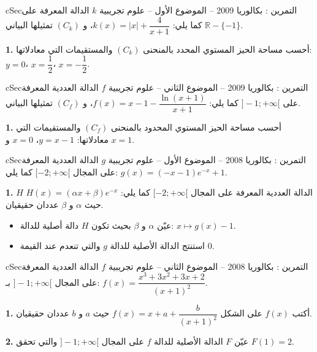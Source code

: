 \documentclass[12pt,a4paper]{article}
\newenvironment{BOX}[2]{\begin{otherlanguage}{english}\begin{arbox}{#1}{#2}}{\end{arbox}\end{otherlanguage}}
\newcounter{exo}
\newenvironment{tamrin}[1]{\stepcounter{exo}\begin{BOX}{cSec}{التمرين \theexo: #1}}{\end{BOX}}
\newcommand{\R}{\mathbb{R}}
\newenvironment{sq}{\begin{itemize}[leftmargin=2.4em,itemsep=3pt]}{\end{itemize}}
\newcommand{\qa}{\item[(أ)]}\newcommand{\qb}{\item[(ب)]}\newcommand{\qc}{\item[(جـ)]}\newcommand{\qd}{\item[(د)]}\newcommand{\qe}{\item[(هـ)]}
\newcommand{\QQ}[1]{\par\smallskip\textbf{#1.} }
\begin{document}
\begin{tamrin}{بكالوريا 2009 -- الموضوع الأول -- علوم تجريبية}
$k$ الدالة المعرفة على $\R-\{-1\}$ كما يلي: $k(x)=|x|+\dfrac4{x+1}$، و $(C_k)$ تمثيلها البياني.
\QQ{1} أحسب مساحة الحيز المستوي المحدد بالمنحنى $(C_k)$ والمستقيمات التي معادلاتها: $y=0$، $x=\dfrac12$، $x=-\dfrac12$.
\end{tamrin}

\begin{tamrin}{بكالوريا 2009 -- الموضوع الثاني -- علوم تجريبية}
$f$ الدالة العددية المعرفة على $]-1;+\infty[$ كما يلي: $f(x)=x-1-\dfrac{\ln(x+1)}{x+1}$، و $(C_f)$ تمثيلها البياني.
\QQ{1} أحسب مساحة الحيز المستوي المحدود بالمنحنى $(C_f)$ والمستقيمات التي معادلاتها: $y=x-1$، $x=0$ و $x=1$.
\end{tamrin}

\begin{tamrin}{بكالوريا 2008 -- الموضوع الأول -- علوم تجريبية}
$g$ الدالة العددية المعرفة على المجال $[-2;+\infty[$ كما يلي: $g(x)=(-x-1)e^{-x}+1$.
\QQ{1} $H$ الدالة العددية المعرفة على المجال $[-2;+\infty[$ كما يلي: $H(x)=(\alpha x+\beta)e^{-x}$ حيث $\alpha$ و $\beta$ عددان حقيقيان.
\begin{sq}
\qa عيّن $\alpha$ و $\beta$ بحيث تكون $H$ دالة أصلية للدالة: $x\mapsto g(x)-1$.
\qb استنتج الدالة الأصلية للدالة $g$ والتي تنعدم عند القيمة $0$.
\end{sq}
\end{tamrin}

\begin{tamrin}{بكالوريا 2008 -- الموضوع الثاني -- علوم تجريبية}
$f$ الدالة العددية المعرفة على المجال $]-1;+\infty[$ بـ: $f(x)=\dfrac{x^3+3x^2+3x+2}{(x+1)^2}$.
\QQ{1} أكتب $f(x)$ على الشكل $f(x)=x+a+\dfrac{b}{(x+1)^2}$ حيث $a$ و $b$ عددان حقيقيان.
\QQ{2} عيّن $F$ الدالة الأصلية للدالة $f$ على المجال $]-1;+\infty[$ والتي تحقق $F(1)=2$.
\end{tamrin}
\end{document}
